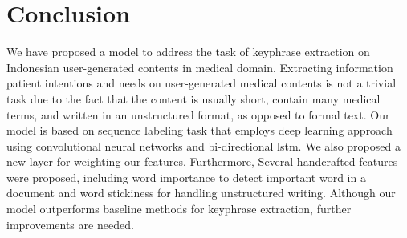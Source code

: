 \documentclass[sigconf]{acmart}
\begin{document}
	\section{Conclusion}
	We have proposed a model to address the task of keyphrase extraction on Indonesian user-generated contents in medical domain. Extracting information patient intentions and needs on user-generated medical contents is not a trivial task due to the fact that the content is usually short, contain many medical terms, and written in an unstructured format, as opposed to formal text. Our model is based on sequence labeling task that employs deep learning approach using convolutional neural networks and bi-directional lstm. We also proposed a new layer for weighting our features. Furthermore, Several handcrafted features were proposed, including word importance to detect important word in a document and word stickiness for handling unstructured writing. Although our model outperforms baseline methods for keyphrase extraction, further improvements are needed.
	
	
	 
	
\end{document}
